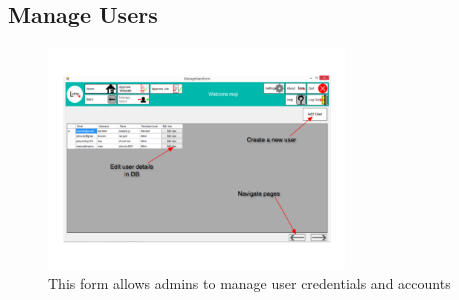 \documentclass[oneside,openany,11pt,a4paper]{report}
\begin{document}
\subsection{Manage Users}
\begin{figure}[H]
	\centering
	\includegraphics[width=0.7\textwidth]{screen/manageuser.png}
	\caption{This form allows admins to manage user credentials and accounts}
\end{figure}
\end{document}
